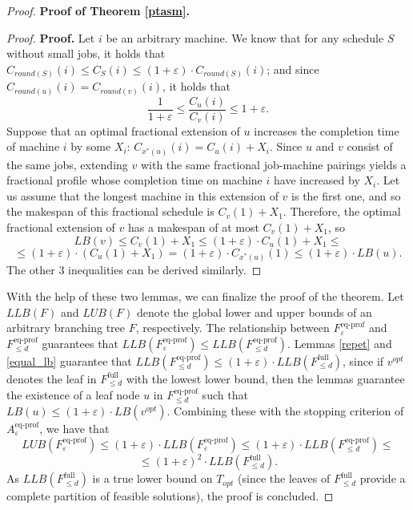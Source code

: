 \documentclass[moor,sglanonrev]{informs4}
\theoremstyle{plain}
\begin{document}
\begin{proof}{\textbf{Proof of Theorem \ref{ptasm}.}}
\begin{proof}{\textbf{Proof.}}
        Let $i$ be an arbitrary machine. We know that for any schedule $S$ without small jobs, it holds that $C_{round(S)}(i) \le C_S(i) \le (1+\varepsilon)\cdot C_{round(S)}(i)$; and since $C_{round(u)}(i) = C_{round(v)}(i)$, it holds that 
        \[
        \frac{1}{1+\varepsilon} \le \frac{C_u(i)}{C_v(i)} \le 1+\varepsilon.
        \]
        Suppose that an optimal fractional extension of $u$ increases the completion time of machine $i$ by some $X_i$: $C_{x^*(u)}(i) = C_u(i) + X_i$. Since $u$ and $v$ consist of the same jobs, extending $v$ with the same fractional job-machine pairings yields a fractional profile whose completion time on machine $i$ have increased by $X_i$. Let us assume that the longest machine in this extension of $v$ is the first one, and so the makespan of this fractional schedule is $C_v(1) + X_1$. Therefore, the optimal fractional extension of $v$ has a makespan of at most $C_v(1) + X_1$, so
        \[
        LB(v) \le C_v(1) + X_1 \le (1+\varepsilon)\cdot C_u (1) + X_1 \le 
        \]
        \[
        \le (1+\varepsilon) \cdot (C_u(1) + X_1) = (1+\varepsilon) \cdot C_{x^*(u)}(1) \le (1+\varepsilon)\cdot LB(u).
        \]
        The other $3$ inequalities can be derived similarly. \hfill \Halmos
    \end{proof}

    With the help of these two lemmas, we can finalize the proof of the theorem. Let $LLB(F)$ and $LUB(F)$ denote the global lower and upper bounds of an arbitrary branching tree $F$, respectively. The relationship between $F^{\text{eq-prof}}_{\varepsilon}$ and $F^{\text{eq-prof}}_{\le d}$ guarantees that $LLB(F^{\text{eq-prof}}_{\varepsilon}) \le LLB(F^{\text{eq-prof}}_{\le d})$. Lemmas \ref{repet} and \ref{equal_lb} guarantee that $LLB(F^{\text{eq-prof}}_{\le d})\le (1+\varepsilon)\cdot LLB(F^{\text{full}}_{\le d})$, since if $v^{opt}$ denotes the leaf in $F^{\text{full}}_{\le d}$ with the lowest lower bound, then the lemmas guarantee the existence of a leaf node $u$ in $F^{\text{eq-prof}}_{\le d}$ such that $LB(u)\le (1+\varepsilon) \cdot LB(v^{opt})$. Combining these with the stopping criterion of $A^{\text{eq-prof}}_{\varepsilon
    }$, we have that
    \[
    LUB(F^{\text{eq-prof}}_{\varepsilon}) \le (1+\varepsilon)\cdot LLB(F^{\text{eq-prof}}_{\varepsilon}) \le (1+\varepsilon)\cdot LLB(F^{\text{eq-prof}}_{\le d})\le 
    \]
    \[
    \le (1+\varepsilon)^2 \cdot LLB(F^{\text{full}}_{\le d}).
    \]
    As $LLB(F^{\text{full}}_{\le d})$ is a true lower bound on $T_{opt}$ (since the leaves of $F^{\text{full}}_{\le d}$ provide a complete partition of feasible solutions), the proof is concluded. \hfill \Halmos
\end{proof}
\end{document}
